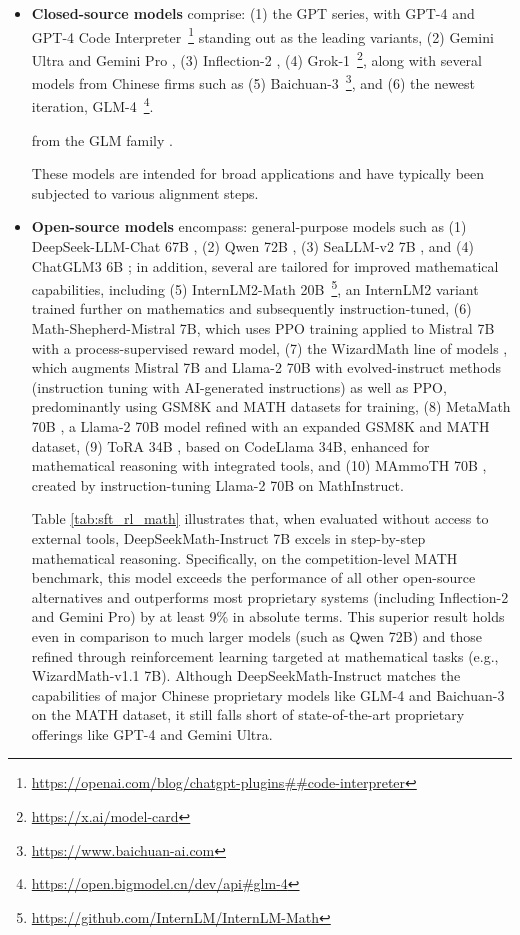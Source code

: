 \begin{itemize}[topsep=0pt]
\begin{itemize}[topsep=0pt]
    \item \textbf{Closed-source models} comprise: (1) the GPT series, with GPT-4 \citep{gpt4} and GPT-4 Code Interpreter~\footnote{\url{https://openai.com/blog/chatgpt-plugins\#\#code-interpreter}} standing out as the leading variants, (2) Gemini Ultra and Gemini Pro \citep{gemini}, (3) Inflection-2 \citep{inflection-2}, (4) Grok-1~\footnote{\url{https://x.ai/model-card}}, along with several models from Chinese firms such as (5) Baichuan-3~\footnote{\url{https://www.baichuan-ai.com}}, and (6) the newest iteration, GLM-4~\footnote{\url{https://open.bigmodel.cn/dev/api\#glm-4}}.

    from the GLM family \citep{glm}.

These models are intended for broad applications and have typically been subjected to various alignment steps.
    \item \textbf{Open-source models} encompass: general-purpose models such as (1) DeepSeek-LLM-Chat 67B \citep{deepseek-llm}, (2) Qwen 72B \citep{qwen}, (3) SeaLLM-v2 7B \citep{seallm}, and (4) ChatGLM3 6B \citep{chatglm3}; in addition, several are tailored for improved mathematical capabilities, including (5) InternLM2-Math 20B~\footnote{\url{https://github.com/InternLM/InternLM-Math}}, an InternLM2 variant trained further on mathematics and subsequently instruction-tuned, (6) Math-Shepherd-Mistral 7B, which uses PPO training \citep{schulman2017proximal} applied to Mistral 7B \citep{mistral} with a process-supervised reward model, (7) the WizardMath line of models \citep{wizardmath}, which augments Mistral 7B and Llama-2 70B \citep{llama2} with evolved-instruct methods (instruction tuning with AI-generated instructions) as well as PPO, predominantly using GSM8K and MATH datasets for training, (8) MetaMath 70B \citep{metamath}, a Llama-2 70B model refined with an expanded GSM8K and MATH dataset, (9) ToRA 34B \cite{tora}, based on CodeLlama 34B, enhanced for mathematical reasoning with integrated tools, and (10) MAmmoTH 70B \citep{MathInstruct}, created by instruction-tuning Llama-2 70B on MathInstruct.

Table \ref{tab:sft_rl_math} illustrates that, when evaluated without access to external tools, DeepSeekMath-Instruct 7B excels in step-by-step mathematical reasoning. Specifically, on the competition-level MATH benchmark, this model exceeds the performance of all other open-source alternatives and outperforms most proprietary systems (including Inflection-2 and Gemini Pro) by at least 9\% in absolute terms. This superior result holds even in comparison to much larger models (such as Qwen 72B) and those refined through reinforcement learning targeted at mathematical tasks (e.g., WizardMath-v1.1 7B). Although DeepSeekMath-Instruct matches the capabilities of major Chinese proprietary models like GLM-4 and Baichuan-3 on the MATH dataset, it still falls short of state-of-the-art proprietary offerings like GPT-4 and Gemini Ultra.


\end{itemize}
\end{itemize}
